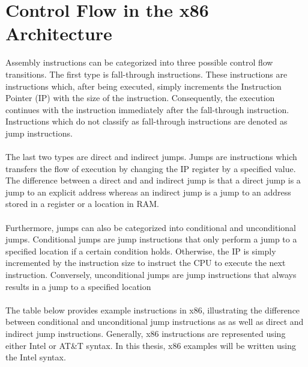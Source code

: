 \documentclass{kththesis}
\newcommand{\fbcomment}[1]{{#1}}
\renewcommand{\fbcomment}[1]{}
\begin{document}
\section{Control Flow in the x86 Architecture}\label{sec:controlFlowInX86}
\fbcomment{\color{red}Goal: Give the reader an understanding of what assembly instructions affect control flow and how}
Assembly instructions can be categorized into three possible control flow transitions\cite{CFGFromPowerPC}. The first type is fall-through instructions. These instructions are instructions which, after being executed, simply increments the Instruction Pointer (IP) with the size of the instruction. Consequently, the execution continues with the instruction immediately after the fall-through instruction. Instructions which do not classify as fall-through instructions are denoted as jump instructions. 
\\ \\
The last two types are direct and indirect jumps. Jumps are instructions which transfers the flow of execution by changing the IP register by a specified value. The difference between a direct and and indirect jump is that a direct jump is a jump to an explicit address whereas an indirect jump is a jump to an address stored in a register or a location in RAM. 
\\ \\
Furthermore, jumps can also be categorized into conditional and unconditional jumps. Conditional jumps are jump instructions that only perform a jump to a specified location if a certain condition holds. Otherwise, the IP is simply incremented by the instruction size to instruct the CPU to execute the next instruction. Conversely, unconditional jumps are jump instructions that always results in a jump to a specified location
\\ \\
The table below provides example instructions in x86, illustrating the difference between conditional and unconditional jump instructions as as well as direct and indirect jump instructions. Generally, x86 instructions are represented using either Intel or AT\&T syntax. In this thesis, x86 examples will be written using the Intel syntax.
\end{document}

